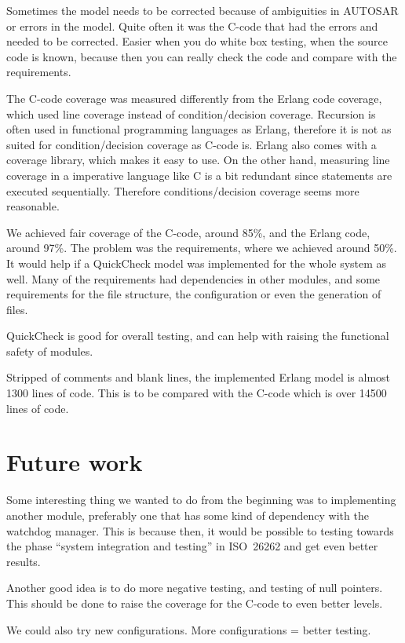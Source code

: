 Sometimes the model needs to be corrected because of ambiguities in
AUTOSAR or errors in the model. Quite often it was the C-code that had
the errors and needed to be corrected.  Easier when you do white box
testing, when the source code is known, because then you can really
check the code and compare with the requirements.

The C-code coverage was measured differently from the Erlang code
coverage, which used line coverage instead of condition/decision
coverage. Recursion is often used in functional programming languages
as Erlang, therefore it is not as suited for condition/decision
coverage as C-code is. Erlang also comes with a coverage library,
which makes it easy to use. On the other hand, measuring line coverage
in a imperative language like C is a bit redundant since statements
are executed sequentially. Therefore conditions/decision coverage
seems more reasonable.

We achieved fair coverage of the C-code, around 85\%, and the Erlang
code, around 97\%. The problem was the requirements, where we achieved
around 50\%. It would help if a QuickCheck model was implemented for
the whole system as well. Many of the requirements had dependencies in
other modules, and some requirements for the file structure, the
configuration or even the generation of files.

QuickCheck is good for overall testing, and can help with raising the
functional safety of modules.


Stripped of comments and blank lines, the implemented Erlang model is
almost 1300 lines of code. This is to be compared with the C-code
which is over 14500 lines of code.


\section{Future work}
Some interesting thing we wanted to do from the beginning was to implementing
another module, preferably one that has some kind of dependency with the
watchdog manager. This is because then, it would be possible to testing towards
the phase ``system integration and testing'' in ISO~26262 and get even better
results.

Another good idea is to do more negative testing, and testing of null
pointers. This should be done to raise the coverage for the C-code to even
better levels.

We could also try new configurations. More configurations = better testing.